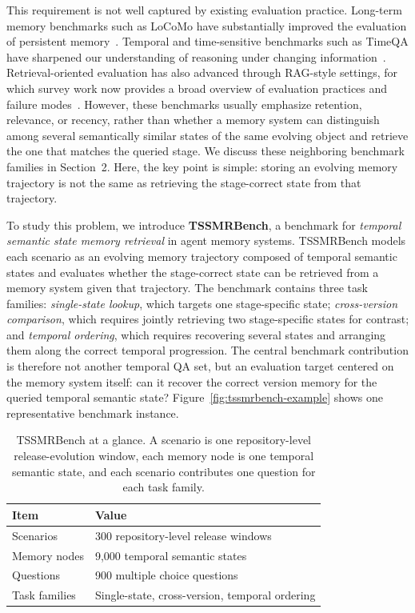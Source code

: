 This requirement is not well captured by existing evaluation practice. Long-term memory benchmarks such as LoCoMo have substantially improved the evaluation of persistent memory~\cite{locomo2024}. Temporal and time-sensitive benchmarks such as TimeQA have sharpened our understanding of reasoning under changing information~\cite{timeqa2021}. Retrieval-oriented evaluation has also advanced through RAG-style settings, for which survey work now provides a broad overview of evaluation practices and failure modes~\cite{gao2023rag}. However, these benchmarks usually emphasize retention, relevance, or recency, rather than whether a memory system can distinguish among several semantically similar states of the same evolving object and retrieve the one that matches the queried stage. We discuss these neighboring benchmark families in Section~2. Here, the key point is simple: storing an evolving memory trajectory is not the same as retrieving the stage-correct state from that trajectory.

To study this problem, we introduce \textbf{TSSMRBench}, a benchmark for \emph{temporal semantic state memory retrieval} in agent memory systems. TSSMRBench models each scenario as an evolving memory trajectory composed of temporal semantic states and evaluates whether the stage-correct state can be retrieved from a memory system given that trajectory. The benchmark contains three task families: \emph{single-state lookup}, which targets one stage-specific state; \emph{cross-version comparison}, which requires jointly retrieving two stage-specific states for contrast; and \emph{temporal ordering}, which requires recovering several states and arranging them along the correct temporal progression. The central benchmark contribution is therefore not another temporal QA set, but an evaluation target centered on the memory system itself: can it recover the correct version memory for the queried temporal semantic state? Figure~\ref{fig:tssmrbench-example} shows one representative benchmark instance.

\begin{table}[!b]
\centering
\small
\caption{TSSMRBench at a glance. A scenario is one repository-level release-evolution window, each memory node is one temporal semantic state, and each scenario contributes one question for each task family.}
\label{tab:benchmark-at-a-glance}
\begin{tabular}{ll}
\toprule
Item & Value \\
\midrule
Scenarios & 300 repository-level release windows \\
Memory nodes & 9{,}000 temporal semantic states \\
Questions & 900 multiple choice questions \\
Task families & Single-state, cross-version, temporal ordering \\
\bottomrule
\end{tabular}
\end{table}

